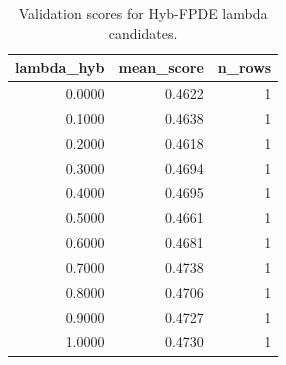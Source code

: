 \begin{table}[t]
\caption{Validation scores for Hyb-FPDE lambda candidates.}
\label{tab:lambda_distribution_computed}
\centering
\begin{tabular}{rrr}
\toprule
lambda\_hyb & mean\_score & n\_rows \\
\midrule
0.0000 & 0.4622 & 1 \\
0.1000 & 0.4638 & 1 \\
0.2000 & 0.4618 & 1 \\
0.3000 & 0.4694 & 1 \\
0.4000 & 0.4695 & 1 \\
0.5000 & 0.4661 & 1 \\
0.6000 & 0.4681 & 1 \\
0.7000 & 0.4738 & 1 \\
0.8000 & 0.4706 & 1 \\
0.9000 & 0.4727 & 1 \\
1.0000 & 0.4730 & 1 \\
\bottomrule
\end{tabular}

\end{table}
